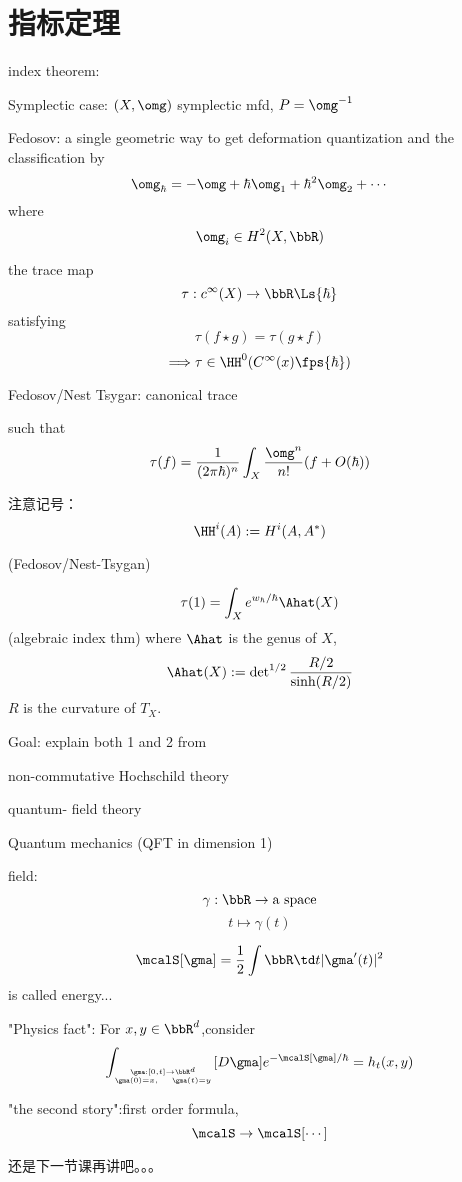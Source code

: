 

\section{指标定理}
index theorem:

Symplectic case: $(X,\omg)$ symplectic mfd,
$P=\omg^{-1}$

Fedosov: a single geometric way
to get deformation quantization and the classification by
$$\omg_{\hbar}=-\omg+\hbar\omg_1+\hbar^2\omg_2+\cdots$$
where
$$\omg_i\in H^2(X,\bbR)$$

\begin{definition}
 the trace map
$$\tau: c^{\infty}(X)\to \bbR\Ls{\hbar}$$
satisfying
$$\tau(f\star g)=\tau(g\star f)$$
$$\Longrightarrow \tau\in \HH^0(C^{\infty}(x)\fps{\hbar})$$

Fedosov/Nest Tsygar: canonical trace

such that
$$\tau(f)=\frac{1}{(2\pi\hbar)^n}
\int_X
  \frac{\omg^n}{n!}
  (f+O(\hbar))$$
\end{definition}

注意记号：
$$\HH^i(A):=H^i(A,A^*)$$


\begin{thm}(Fedosov/Nest-Tsygan)

$$\tau(1)=\int_X e^{w_{\hbar}/\hbar}\Ahat(X)$$
(algebraic index thm)
where $\Ahat$ is the genus of $X$,
$$\Ahat(X):=
\det\nolimits^{1/2}\frac{R/2}{\sinh(R/2)}$$
$R$ is the curvature of $T_X$.
\end{thm}

Goal: explain both 1 and 2 from

non-commutative Hochschild theory

quantum- field theory 

\begin{example}Quantum mechanics (QFT in dimension 1)

field:
$$\gamma:\bbR\to\text{a space}$$
$$t\mapsto \gamma(t)$$

$$\mcalS[\gma]=\frac{1}{2}\int\bbR\td t|\gma'(t)|^2$$
is called energy...

\end{example}

"Physics fact": For $x,y\in\bbR^d$,consider
$$\int_{\gma:[0,t]\to\bbR^d\atop\gma(0)=x,\quad\gma(t)=y}
[D\gma]e^{-\mcalS[\gma]/\hbar}
=h_t(x,y)$$

"the second story":first order formula,
$$\mcalS\to\mcalS[\cdots]$$

还是下一节课再讲吧。。。